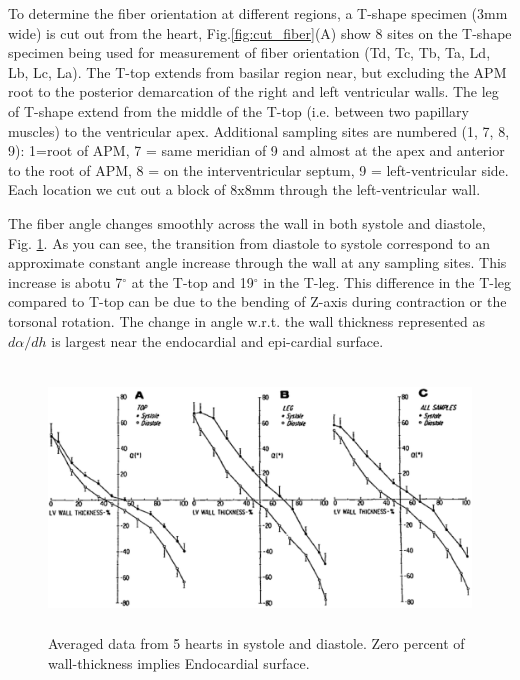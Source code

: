 To determine the fiber orientation at different regions, a T-shape specimen (3mm
wide) is cut out from the heart, Fig.\ref{fig:cut_fiber}(A) show 8 sites on the
T-shape specimen being used for measurement of fiber orientation
(Td, Tc, Tb, Ta, Ld, Lb, Lc, La). The T-top extends from basilar region near,
but excluding the APM root to the posterior demarcation of the right and left
ventricular walls. The leg of T-shape extend from the middle of the T-top (i.e.
between two papillary muscles) to the ventricular apex. Additional sampling
sites are numbered  (1, 7, 8, 9): 1=root of APM, 7 = same meridian of 9 and
almost at the apex and anterior to the root of APM, 8 = on the interventricular
septum, 9 = left-ventricular side. Each location we cut out a block of 8x8mm
through the left-ventricular wall.

The fiber angle changes smoothly across the wall in both systole and diastole,
Fig. \ref{fig:fiber_orientation_systole_diastole}. As you can see, the
transition from diastole to systole correspond to an approximate constant angle
increase through the wall at any sampling sites. This increase is abotu
7$^\circ$ at the T-top and 19$^\circ$ in the T-leg. This difference in the T-leg
compared to T-top can be due to the bending of Z-axis during contraction or the
torsonal rotation. The change in angle w.r.t.
the  wall thickness represented as $d\alpha/dh$ is largest near the endocardial
and epi-cardial surface.

\begin{figure}[hbt]
  \centerline{\includegraphics[height=7cm,
    angle=0]{./images/fiber_orientation_systole_diastole.eps}}
  \caption{Averaged data from 5 hearts in systole and diastole. Zero percent of
  wall-thickness implies Endocardial surface.}
  \label{fig:fiber_orientation_systole_diastole}
\end{figure}




